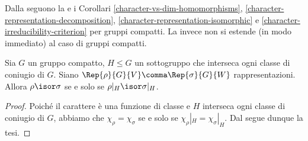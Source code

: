 Dalla  seguono la  e i Corollari \ref{character-vs-dim-homomorphisms}, \ref{character-representation-decomposition}, \ref{character-representation-isomorphic} e \ref{character-irreducibility-criterion} per gruppi compatti. La  invece non si estende (in modo immediato) al caso di gruppi compatti.

\begin{corollary}
Sia $G$ un gruppo compatto, $H\le G$ un sottogruppo che interseca ogni classe di coniugio di $G$. Siano $\Rep{\rho}{G}{V}\comma\Rep{\sigma}{G}{W}$ rappresentazioni. Allora $\rho\isor\sigma$ se e solo se $\rho|_H\isor\sigma|_H$.
\end{corollary}
\begin{proof}
Poiché il carattere è una funzione di classe e $H$ interseca ogni classe di coniugio di $G$, abbiamo che $\chi_\rho=\chi_\sigma$ se e solo se $\chi_\rho|_H=\chi_\sigma|_H$. Dal  segue dunque la tesi.
\end{proof}



